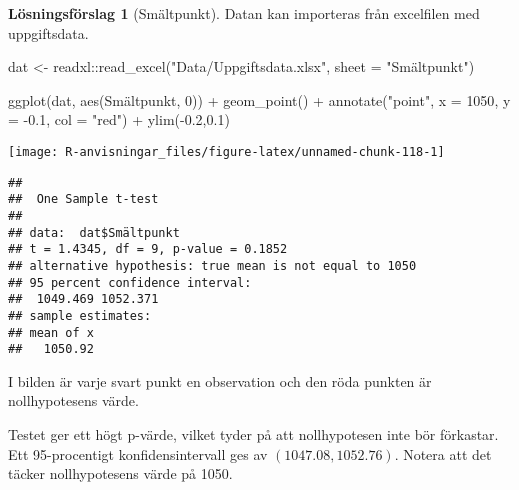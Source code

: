 \documentclass[
]{book}
\newenvironment{Shaded}{\begin{snugshade}}{\end{snugshade}}
\newcommand{\AttributeTok}[1]{\textcolor[rgb]{0.77,0.63,0.00}{#1}}
\newcommand{\DecValTok}[1]{\textcolor[rgb]{0.00,0.00,0.81}{#1}}
\newcommand{\FloatTok}[1]{\textcolor[rgb]{0.00,0.00,0.81}{#1}}
\newcommand{\FunctionTok}[1]{\textcolor[rgb]{0.00,0.00,0.00}{#1}}
\newcommand{\NormalTok}[1]{#1}
\newcommand{\OtherTok}[1]{\textcolor[rgb]{0.56,0.35,0.01}{#1}}
\newcommand{\SpecialCharTok}[1]{\textcolor[rgb]{0.00,0.00,0.00}{#1}}
\newcommand{\StringTok}[1]{\textcolor[rgb]{0.31,0.60,0.02}{#1}}
\theoremstyle{definition}
\theoremstyle{definition}
\theoremstyle{definition}
\theoremstyle{definition}
\newtheorem{hypothesis}{Lösningsförslag}[chapter]
\theoremstyle{remark}
\begin{document}
\begin{hypothesis}[Smältpunkt]
Datan kan importeras från excelfilen med uppgiftsdata.

\begin{Shaded}
\begin{Highlighting}[]
\NormalTok{dat }\OtherTok{\textless{}{-}}\NormalTok{ readxl}\SpecialCharTok{::}\FunctionTok{read\_excel}\NormalTok{(}\StringTok{"Data/Uppgiftsdata.xlsx"}\NormalTok{, }\AttributeTok{sheet =} \StringTok{"Smältpunkt"}\NormalTok{)}

\FunctionTok{ggplot}\NormalTok{(dat, }\FunctionTok{aes}\NormalTok{(Smältpunkt, }\DecValTok{0}\NormalTok{)) }\SpecialCharTok{+}
  \FunctionTok{geom\_point}\NormalTok{() }\SpecialCharTok{+}
  \FunctionTok{annotate}\NormalTok{(}\StringTok{"point"}\NormalTok{, }\AttributeTok{x =} \DecValTok{1050}\NormalTok{, }\AttributeTok{y =} \SpecialCharTok{{-}}\FloatTok{0.1}\NormalTok{, }\AttributeTok{col =} \StringTok{"red"}\NormalTok{) }\SpecialCharTok{+}
  \FunctionTok{ylim}\NormalTok{(}\SpecialCharTok{{-}}\FloatTok{0.2}\NormalTok{,}\FloatTok{0.1}\NormalTok{)}
\end{Highlighting}
\end{Shaded}

\begin{center}\texttt{[image: R-anvisningar\_files/figure-latex/unnamed-chunk-118-1]} \end{center}

\begin{Shaded}
\end{Shaded}

\begin{verbatim}
## 
##  One Sample t-test
## 
## data:  dat$Smältpunkt
## t = 1.4345, df = 9, p-value = 0.1852
## alternative hypothesis: true mean is not equal to 1050
## 95 percent confidence interval:
##  1049.469 1052.371
## sample estimates:
## mean of x 
##   1050.92
\end{verbatim}

I bilden är varje svart punkt en observation och den röda punkten är nollhypotesens värde.

Testet ger ett högt p-värde, vilket tyder på att nollhypotesen inte bör förkastar. Ett 95-procentigt konfidensintervall ges av \((1047.08, 1052.76)\). Notera att det täcker nollhypotesens värde på 1050.
\end{hypothesis}
\end{document}
